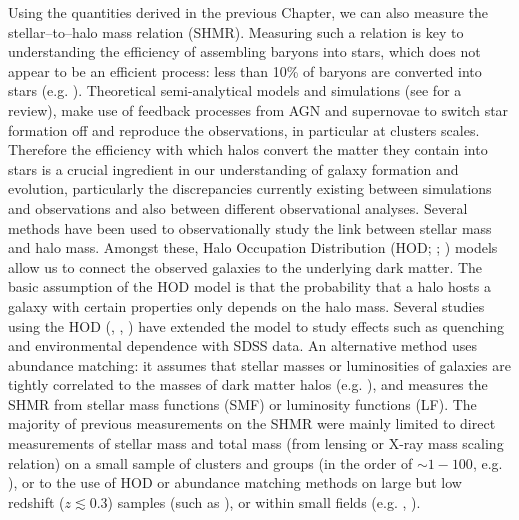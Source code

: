 {Using the quantities derived in the previous Chapter, we can also measure the stellar--to--halo mass relation (SHMR). Measuring such a relation is key to understanding the efficiency of assembling baryons into stars, which does not appear to be an efficient process: less than 10\% of baryons are converted into stars (e.g. \citealt{gallazzi}). Theoretical semi-analytical models and simulations (see \citealt{somerville} for a review), make use of feedback processes from AGN and supernovae to switch star formation off and reproduce the observations, in particular at clusters scales. Therefore the efficiency with which halos convert the matter they contain into stars is a crucial ingredient in our understanding of galaxy formation and evolution, particularly the discrepancies currently existing between simulations and observations and also between different observational analyses. Several methods have been used to observationally study the link between stellar mass and halo mass. Amongst these, Halo Occupation Distribution (HOD; \citealt{seljak}; \citealt{peacock}) models allow us to connect the observed galaxies to the underlying dark matter. The basic assumption of the HOD model is that the probability that a halo hosts a galaxy with certain properties only depends on the halo mass. Several studies using the HOD (\citealt{zu}, \citealt{zu2}, \citealt{zu3}) have extended the model to study effects such as quenching and environmental dependence with SDSS data. 
An alternative method uses abundance matching: it assumes that stellar masses or luminosities of galaxies are tightly correlated to the masses of dark matter halos (e.g. \citealt{moster10}), and measures the SHMR from stellar mass functions (SMF) or luminosity functions (LF). The majority of previous measurements on the SHMR were mainly limited to direct measurements of stellar mass and total mass (from lensing or X-ray mass scaling relation) on a small sample of clusters and groups (in the order of $\sim 1-100$, e.g. \citealt{kravtsov}), or to the use of HOD or abundance matching methods on large but low redshift ($z\lesssim 0.3$) samples (such as \citealt{zu}), or within small fields (e.g. \citealt{coupon}, \citealt{shan}).

}
